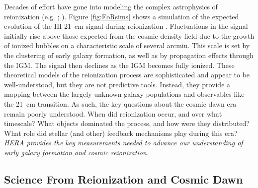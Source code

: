 \documentclass[preprint]{aastex}
\newcommand{\Mycitep}[1]{{\bf \citep{#1}}}
\newcommand{\Mycitealt}[1]{{\bf \citealt{#1}}}
\newcommand{\compress}{\vspace{-0.25in}}
\newcommand{\Caption}[4]{\vspace{#1}\renewcommand{\baselinestretch}{#2}\caption{#4}\vspace{#3}}
\begin{document}

Decades of effort have gone into modeling the complex astrophysics of reionization
(e.g. \citealt{shapiro_giroux1987, haiman_loeb1997}; \Mycitealt{furlanetto_et_al2004, santos_et_al2010}). Figure \ref{fig:EoRsims} shows a 
simulation of the expected evolution of the HI 21~cm signal during reionization \Mycitep{mesinger_furlanetto2007}. Fluctuations in the signal initially 
rise above those expected from the cosmic density field due to the growth of ionized bubbles on a characteristic 
scale of several arcmin. This scale is set by the clustering of early galaxy formation, as well as by 
propagation effects through the IGM. The signal then declines as the IGM becomes fully ionized.  These theoretical 
models of the reionization process are sophisticated and appear to be well-understood, but they are not 
predictive tools. Instead, they provide a mapping between the largely unknown galaxy populations and observables 
like the 21~cm transition. As such, the key questions about the cosmic dawn era remain poorly understood.  When 
did reionization occur, and over what timescale?  What objects dominated the process, and how were they  distributed?  What role did stellar (and other) 
feedback mechanisms play during this era?  {\it HERA provides the key measurements needed 
to advance our understanding of early galaxy formation and cosmic reionization.}



\compress
\subsection{Science From Reionization and Cosmic Dawn} %
\label{sec:science}
\end{document}
